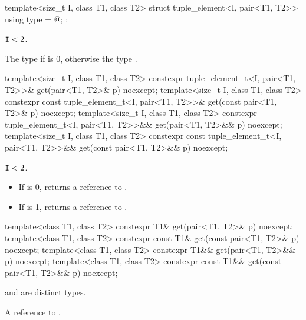 %
\begin{itemdecl}
template<size_t I, class T1, class T2>
  struct tuple_element<I, pair<T1, T2>> {
    using type = @\seebelow@ ;
  };
\end{itemdecl}
\begin{itemdescr}
\pnum
\mandates
$\texttt{I} < 2$.

\pnum
\ctype
The type  if  is 0, otherwise the type .
\end{itemdescr}

%
\begin{itemdecl}
template<size_t I, class T1, class T2>
  constexpr tuple_element_t<I, pair<T1, T2>>& get(pair<T1, T2>& p) noexcept;
template<size_t I, class T1, class T2>
  constexpr const tuple_element_t<I, pair<T1, T2>>& get(const pair<T1, T2>& p) noexcept;
template<size_t I, class T1, class T2>
  constexpr tuple_element_t<I, pair<T1, T2>>&& get(pair<T1, T2>&& p) noexcept;
template<size_t I, class T1, class T2>
  constexpr const tuple_element_t<I, pair<T1, T2>>&& get(const pair<T1, T2>&& p) noexcept;
\end{itemdecl}

\begin{itemdescr}
\pnum
\mandates
$\texttt{I} < 2$.

\pnum
\returns
\begin{itemize}
\item If  is 0, returns a reference to .
\item If  is 1, returns a reference to .
\end{itemize}
\end{itemdescr}

%
\begin{itemdecl}
template<class T1, class T2>
  constexpr T1& get(pair<T1, T2>& p) noexcept;
template<class T1, class T2>
  constexpr const T1& get(const pair<T1, T2>& p) noexcept;
template<class T1, class T2>
  constexpr T1&& get(pair<T1, T2>&& p) noexcept;
template<class T1, class T2>
  constexpr const T1&& get(const pair<T1, T2>&& p) noexcept;
\end{itemdecl}

\begin{itemdescr}
\pnum
\mandates
{} and  are distinct types.

\pnum
\returns
A reference to .
\end{itemdescr}

